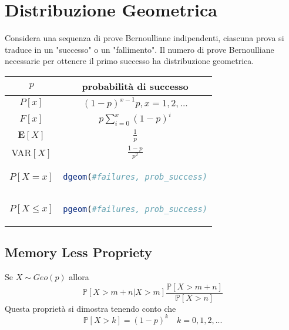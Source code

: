 \section{Distribuzione Geometrica}
\begin{tcolorbox}
Considera una sequenza di prove Bernoulliane indipendenti, ciascuna prova si traduce in un "successo" o un "fallimento". Il numero di prove Bernoulliane necessarie per ottenere il primo successo ha distribuzione geometrica.
\end{tcolorbox}
\begingroup
\setlength{\tabcolsep}{10pt} %
\renewcommand{\arraystretch}{1.5} %
\begin{center}
\begin{tabular}{ |c|c| } 
\hline
\(p\) & probabilità di successo \\ \hline
\(P[x]\) & \((1 - p)^{x-1}p, x = 1,2,...\)\\ \hline
\(F[x]\) & \(p \sum_{i = 0}^x (1 - p)^i\) \\ \hline
\(\mathbf{E}[X]\) & \(\frac{1}{p}\) \\ \hline
VAR\([X]\) & \(\frac{1-p}{p^2}\) \\ \hline\hline
\(P[X = x]\) & \begin{lstlisting}[language=R]
dgeom(#failures, prob_success)
\end{lstlisting} \\ \hline
\(P[X \leq x]\) & \begin{lstlisting}[language=R]
pgeom(#failures, prob_success)
\end{lstlisting} \\ \hline
\end{tabular}
\end{center}
\endgroup

\subsection{Memory Less Propriety}
Se \(X \sim Geo(p)\) allora
\[\mathbb{P}[X > m + n | X > m] \frac{\mathbb{P}[X > m + n]}{\mathbb{P}[X > n]}\]
Questa proprietà si dimostra tenendo conto che
\[\mathbb{P}[X > k] = (1 - p)^k \quad k = 0,1,2,...\]


\newpage
